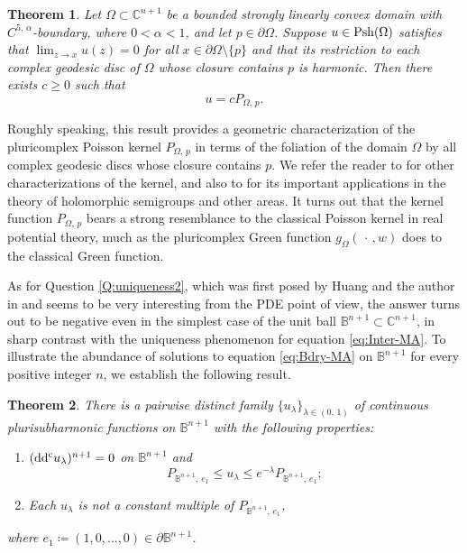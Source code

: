 \documentclass[12pt,a4paper]{amsart}
\numberwithin{equation}{section}
\newtheorem{theorem}{Theorem}[section]
\theoremstyle{definition}
\newcommand{\ddc}{{\rm dd^c}}
\begin{document}
\begin{theorem}\label{thm:main1}
Let $\Omega\subset\mathbb C^{n+1}$ be a bounded strongly linearly convex domain with $C^{5,\,\alpha}$-boundary, where $0<\alpha<1$, and let $p\in\partial\Omega$. Suppose $u\in {\rm Psh}(\Omega)$ satisfies that $\lim_{z\to x}u(z)=0$ for all $x\in\partial\Omega \!\setminus\! \{p\}$ and that its restriction to each complex geodesic disc of $\Omega$ whose closure contains $p$ is harmonic. Then there exists $c\ge 0$ such that
  $$
  u=cP_{\Omega,\, p}.
  $$
\end{theorem}

Roughly speaking, this result provides a geometric characterization of the pluricomplex Poisson kernel $P_{\Omega,\, p}$ in terms of the foliation of the domain $\Omega$ by all complex geodesic discs whose closure contains $p$. We refer the reader to \cite{Bracci-Trans09} for other characterizations of the kernel, and also to \cite{Bracci-JEMS10, Bracci-MathAnn05} for its important applications in the theory of holomorphic semigroups and other areas. It turns out that the kernel function $P_{\Omega,\, p}$ bears a strong resemblance to the classical Poisson kernel in real potential theory, much as the pluricomplex Green function $g_{\Omega}(\,\cdot\,,w)$ does to the classical Green function.

As for Question \ref{Q:uniqueness2}, which was first posed by Huang and the author in \cite{Huang-Wang22} and seems to be very interesting from the PDE point
of view, the answer turns out to be negative even in the simplest case of the unit ball $\mathbb B^{n+1}\subset\mathbb C^{n+1}$, in sharp contrast with the uniqueness phenomenon for equation \eqref{eq:Inter-MA}. To illustrate the abundance of solutions to equation \eqref{eq:Bdry-MA} on $\mathbb B^{n+1}$ for every positive integer $n$, we establish the following result.


\begin{theorem}\label{thm:main2}
There is a pairwise distinct family $\{u_{\lambda}\}_{\lambda\in(0,\, 1)}$ of continuous plurisubharmonic functions on $\mathbb B^{n+1}$ with the following
properties:
\begin{enumerate}[label=\textup{(\roman*)}, leftmargin=2.0pc, parsep=4pt]
   \item  $(\ddc u_{\lambda})^{n+1}=0$ on $\mathbb B^{n+1}$ and
       $$
       P_{\mathbb B^{n+1},\, e_1} \leq u_{\lambda} \leq e^{-\lambda} P_{\mathbb B^{n+1},\, e_1};
       $$

    \item Each $u_{\lambda}$ is not a constant multiple of $P_{\mathbb B^{n+1},\, e_1}$,
\end{enumerate}
where $e_{1}\coloneqq (1, 0,\ldots, 0)\in\partial\mathbb B^{n+1}$.
\end{theorem}
\end{document}
